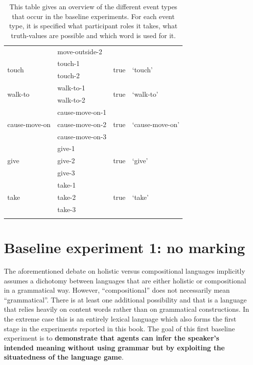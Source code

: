 \begin{table}[htp]
\begin{tabular}{llll}
\\
  &  move-outside-2 & &
\\[.3em]\multirow{2}{*}{touch } &   touch-1 & \multirow{2}{*}{true} & \multirow{2}{*}{`touch'}
\\
 &  touch-2 & &
\\[.3em]\multirow{2}{*}{walk-to } &  walk-to-1 & \multirow{2}{*}{true} & \multirow{2}{*}{`walk-to'}
\\
 &  walk-to-2 & &
\\[.3em]\multirow{3}{*}{cause-move-on } &  cause-move-on-1 & \multirow{3}{*}{true} & \multirow{3}{*}{`cause-move-on'}
\\
  &  cause-move-on-2  & &
\\
  &  cause-move-on-3  & &
\\[.3em]\multirow{3}{*}{give } &  give-1 & \multirow{3}{*}{true} & \multirow{3}{*}{`give'}
\\
 &   give-2 & &
\\
  &  give-3  & &
\\[.3em]\multirow{3}{*}{take } & take-1 & \multirow{3}{*}{true} & \multirow{3}{*}{`take'}
\\
  &   take-2  & &
\\
 &   take-3  & &
\\
\lspbottomrule
 \end{tabular}
\caption[Event-types and their corresponding words]{This table gives an overview of the different event types that occur in the baseline experiments. For each event type, it is specified what participant roles it takes, what truth-values are possible and which word is used for it.}
\label{t:events}
\end{table}

\section{Baseline experiment 1: no marking}
\label{s:base1}

The aforementioned debate on holistic versus compositional languages implicitly assumes a dichotomy between languages that are either holistic or compositional in a grammatical way. However,  ``compositional'' does not necessarily mean ``grammatical''. There is at least one additional possibility and that is a language that relies heavily on content words rather than on grammatical constructions. In the extreme case this is an entirely lexical language which also forms the first stage in the experiments reported in this book. The goal of this first baseline experiment is to {\bfseries demonstrate that agents can infer the speaker's intended meaning without using grammar but by exploiting the situatedness of the language game}.

